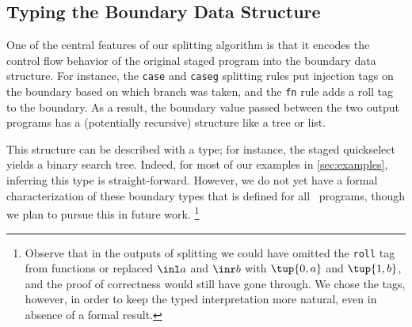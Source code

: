 \begin{abstrsyn}
\subsection{Typing the Boundary Data Structure}

One of the central features of our splitting algorithm is that
it encodes the control flow behavior of the original 
staged program into the boundary data structure.
For instance, the {\tt case} and {\tt caseg} splitting rules 
put injection tags on the boundary based on which branch was taken,
and the {\tt fn} rule adds a roll tag to the boundary.
As a result, the boundary value passed between the two output programs has a (potentially recursive) structure like a tree or list.

This structure can be described with a type; for instance, the staged quickselect yields a binary search tree.
Indeed, for most of our examples in \ref{sec:examples}, inferring this type is straight-forward. 
However, we do not yet have a formal characterization of these boundary types that is defined for all \lang\ programs,
though we plan to pursue this in future work.%
\footnote{Observe that in the outputs of splitting we could have omitted the {\tt roll} tag from functions or 
replaced $\inl a$ and $\inr b$ with $\tup {0,a}$ and $\tup {1,b}$, and the proof of correctness would still have gone through.
We chose the tags, however, in order to keep the typed interpretation more natural, even in absence of a formal result.
}
\end{abstrsyn}

